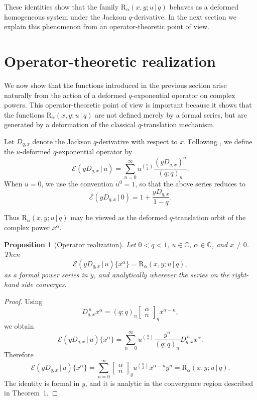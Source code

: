 \documentclass[12pt]{article}
\newcommand{\rr}{\mathrm{R}}
\newcommand{\E}{\mathcal{E}}
\newtheorem{proposition}{Proposition}
\begin{document}
These identities show that the family \(\rr_{\alpha}(x,y;u\,|\,q)\) behaves
as a deformed homogeneous system under the Jackson \(q\)-derivative. In
the next section we explain this phenomenon from an operator-theoretic
point of view. 


\section{Operator-theoretic realization}

We now show that the functions introduced in the previous section arise
naturally from the action of a deformed \(q\)-exponential operator on
complex powers. This operator-theoretic point of view is important
because it shows that the functions \(\rr_{\alpha}(x,y;u\,|\,q)\) are not defined merely by a formal series, but are generated by a deformation of the classical \(q\)-translation mechanism.

Let \(D_{q,x}\) denote the Jackson \(q\)-derivative with respect to \(x\). Following \cite{orozco}, we define the \(u\)-deformed \(q\)-exponential operator by
\[
\E(yD_{q,x}\,|\,u)
=
\sum_{n=0}^{\infty}
u^{\binom{n}{2}}
\frac{(yD_{q,x})^n}{(q;q)_n}.
\]
When \(u=0\), we use the convention \(u^0=1\), so that the above series
reduces to
\[
\E(yD_{q,x}\,|\,0)
=
1+\frac{yD_{q,x}}{1-q}.
\]

Thus \(\rr_{\alpha}(x,y;u\,|\,q)\) may be viewed as the deformed \(q\)-translation orbit of the complex power \(x^\alpha\).

\begin{proposition}[Operator realization]\label{prop_translation}
Let \(0<q<1\), \(u\in\mathbb C\), \(\alpha\in\mathbb C\), and \(x\neq0\).
Then
\[
\E(yD_{q,x}\,|\,u)\{x^\alpha\}
=
\rr_{\alpha}(x,y;u\,|\,q),
\]
as a formal power series in \(y\), and analytically wherever the series
on the right-hand side converges.
\end{proposition}
\begin{proof}
Using
\[
D_{q,x}^{\,n}x^\alpha
=
(q;q)_n
\begin{bmatrix}
\alpha\\ n
\end{bmatrix}_q
x^{\alpha-n},
\]
we obtain
\[
\mathcal E(yD_{q,x}\,|\,u)\{x^\alpha\}
=
\sum_{n=0}^{\infty}
u^{\binom{n}{2}}
\frac{y^n}{(q;q)_n}
D_{q,x}^{\,n}x^\alpha.
\]
Therefore
\[
\mathcal E(yD_{q,x}\,|\,u)\{x^\alpha\}
=
\sum_{n=0}^{\infty}
\begin{bmatrix}
\alpha\\ n
\end{bmatrix}_q
u^{\binom{n}{2}}
x^{\alpha-n}y^n
=
\rr_{\alpha}(x,y;u\,|\,q).
\]
The identity is formal in \(y\), and it is analytic in the convergence
region described in Theorem~1.
\end{proof}
\end{document}
